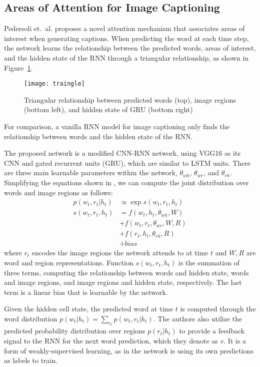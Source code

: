 \documentclass[10pt,twocolumn,letterpaper]{article}
\newcommand{\figref}[1]{Figure~\ref{fig:#1}}
\begin{document}
\subsection{Areas of Attention for Image Captioning}

Pedersoli et.\ al.\cite{attentionwhere} proposes a novel attention mechanism
that associates areas of interest when generating captions. When predicting
the word at each time step, the network learns the relationship between the
predicted words, areas of interest, and the hidden state of the RNN through a
triangular relationship, as shown in \figref{triangle}.
%
\begin{figure}
  \centering
  \texttt{[image: traingle]}
  \caption{Triangular relationship between predicted words (top), image
  regions (bottom left), and hidden state of GRU (bottom right)}
  \label{fig:triangle}
\end{figure}
%
For comparison, a vanilla RNN model for image captioning only finds the
relationship between words and the hidden state of the RNN.
  
The proposed network is a modified CNN-RNN network, using VGG16 as its CNN and
gated recurrent units (GRU), which are similar to LSTM units. There are three
main learnable parameters within the network, $\theta_{wh}$, $\theta_{wr}$,
and $\theta_{rh}$.  Simplifying the equations shown in \cite{attentionwhere},
we can compute the joint distribution over words and image regions as follows:
%
\begin{equation}
  \begin{aligned}
    p(w_t, r_t|h_t) &\propto \exp s(w_t, r_t, h_t) \\
    s(w_t, r_t, h_t) &= f(w_t, h_t, \theta_{wh}, W) \\
                     &+ f(w_t, r_t, \theta_{wr}, W, R) \\
                     &+ f(r_t, h_t, \theta_{rh}, R) \\
                     &+ bias
  \end{aligned}
\end{equation}
%
where $r_t$ encodes the image regions the network attends to at time $t$ and
$W,R$ are word and region representations. Function $s(w_t, r_t, h_t)$ is the
summation of three terms, computing the relationship between words and hidden
state, words and image regions, and image regions and hidden state,
respectively. The last term is a linear bias that is learnable by the network.

Given the hidden cell state, the predicted word at time $t$ is computed
through the word distribution $p(w_t|h_t) = \sum_{r_t} p(w_t,r_t|h_t)$. The
authors also utilize the predicted probability distribution over regions
$p(r_t|h_t)$ to provide a feedback signal to the RNN for the next word
prediction, which they denote as $v$. It is a form of weakly-supervised
learning, as in the network is using its own predictions as labels to train.
\end{document}
